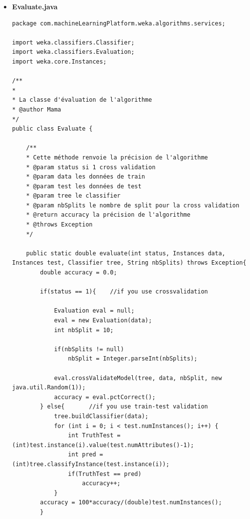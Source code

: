 \documentclass[a4paper,11pt]{article}
\begin{document}
\begin{itemize}
\begin{itemize}
\begin{verbatim}
    @Autowired
    WekaServiceImpl wekaService;

    @CrossOrigin(origins = "http://localhost:3000")
    @PostMapping("/upload")
    public HashMap<String, String> FileUpload(
        @RequestParam(required = false) MultipartFile train,
        @RequestParam(required = false) MultipartFile test,
        @RequestParam("rf") Boolean rf,
        @RequestParam("nb") Boolean nb,
        @RequestParam("jr") Boolean jr,
        @RequestParam("cv") boolean cv,
        @RequestParam(name = "nbSplits", required = false) String nbSplits
        )
    {

        return wekaService.upload(train, test, rf, nb, jr, cv, nbSplits);

    }

}

\end{verbatim}
\end{itemize}

\item \textbf{Evaluate.java}
\begin{verbatim}
package com.machineLearningPlatform.weka.algorithms.services;

import weka.classifiers.Classifier;
import weka.classifiers.Evaluation;
import weka.core.Instances;

/**
*
* La classe d'évaluation de l'algorithme
* @author Mama
*/
public class Evaluate {

    /**
    * Cette méthode renvoie la précision de l'algorithme
    * @param status si 1 cross validation
    * @param data les données de train
    * @param test les données de test
    * @param tree le classifier
    * @param nbSplits le nombre de split pour la cross validation
    * @return accuracy la précision de l'algorithme
    * @throws Exception
    */

    public static double evaluate(int status, Instances data, Instances test, Classifier tree, String nbSplits) throws Exception{
        double accuracy = 0.0;

        if(status == 1){    //if you use crossvalidation

            Evaluation eval = null;
            eval = new Evaluation(data);
            int nbSplit = 10;

            if(nbSplits != null)
                nbSplit = Integer.parseInt(nbSplits);

            eval.crossValidateModel(tree, data, nbSplit, new java.util.Random(1));
            accuracy = eval.pctCorrect();
        } else{       //if you use train-test validation
            tree.buildClassifier(data);
            for (int i = 0; i < test.numInstances(); i++) {
                int TruthTest = (int)test.instance(i).value(test.numAttributes()-1);
                int pred = (int)tree.classifyInstance(test.instance(i));
                if(TruthTest == pred)
                    accuracy++;
            }
        accuracy = 100*accuracy/(double)test.numInstances();
        }


\end{verbatim}
\end{itemize}
\end{document}
